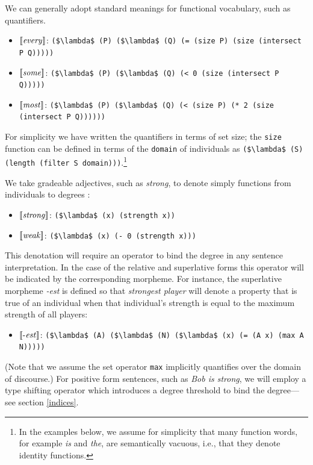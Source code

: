 \documentclass[pdfextras]{handbook}
\newcommand{\llbracket}{\ensuremath{\left [\!\left [}}%
\newcommand{\rrbracket}{\ensuremath{\right ]\!\right ]}}
\providecommand{\sv}[1]{\ensuremath{\llbracket \mathit{#1} \rrbracket}}
\begin{document}
We can generally adopt standard meanings for functional vocabulary, such as quantifiers. 
\begin{itemize}
\item \sv{every}: \lstinline[mathescape]{($\lambda$ (P) ($\lambda$ (Q) (= (size P) (size (intersect P Q)))))}
\item \sv{some}: \lstinline[mathescape]{($\lambda$ (P) ($\lambda$ (Q) (< 0 (size (intersect P Q)))))}   
\item \sv{most}: \lstinline[mathescape]{($\lambda$ (P) ($\lambda$ (Q) (< (size P) (* 2 (size (intersect P Q))))))}
\end{itemize}
For simplicity we have written the quantifiers in terms of set size; the \lstinline{size} function can be defined in terms of the  \lstinline{domain} of individuals as \lstinline[mathescape]{($\lambda$ (S) (length (filter S domain)))}.\footnote{In the examples below, we assume for simplicity that many function words, for example \emph{is} and \emph{the}, are semantically vacuous, i.e., that they denote identity functions.}

We take gradeable adjectives, such as \emph{strong}, to denote simply functions from individuals to degrees \citep[e.g.][]{neeleman2004degree}:
\begin{itemize}
\item \sv{strong}: \lstinline[mathescape]{($\lambda$ (x) (strength x))}
\item \sv{weak}: \lstinline[mathescape]{($\lambda$ (x) (- 0 (strength x)))}
\end{itemize}
This denotation will require an operator to bind the degree in any sentence interpretation. In the case of the relative and superlative forms this operator will be indicated by the corresponding morpheme.
For instance, the superlative morpheme \emph{-est} is defined so that \emph{strongest player} will denote a property that is true of an individual when that individual's strength is equal to the maximum strength of all players: 
\begin{itemize}
\item \sv{\text{-}est}: \lstinline[mathescape]{($\lambda$ (A) ($\lambda$ (N) ($\lambda$ (x) (= (A x) (max A N)))))}
\end{itemize}
(Note that we assume the set operator \lstinline{max}  implicitly quantifies over the domain of discourse.)
For positive form sentences, such as \emph{Bob is strong}, we will employ a type shifting operator which introduces a degree threshold to bind the degree---see section \ref{indices}.
\end{document}
